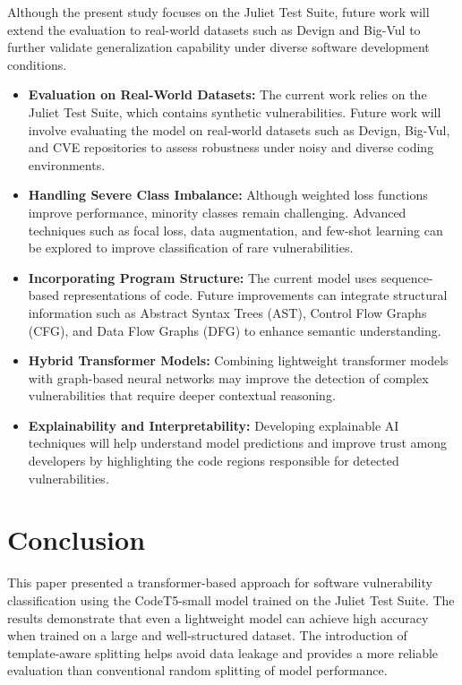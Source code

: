\documentclass[conference]{IEEEtran}
\begin{document}
Although the present study focuses on the Juliet Test Suite, future work will extend the evaluation to real-world datasets such as Devign and Big-Vul to further validate generalization capability under diverse software development conditions.

\begin{itemize}

\item \textbf{Evaluation on Real-World Datasets:}  
The current work relies on the Juliet Test Suite, which contains synthetic vulnerabilities. Future work will involve evaluating the model on real-world datasets such as Devign, Big-Vul, and CVE repositories to assess robustness under noisy and diverse coding environments.

\item \textbf{Handling Severe Class Imbalance:}  
Although weighted loss functions improve performance, minority classes remain challenging. Advanced techniques such as focal loss, data augmentation, and few-shot learning can be explored to improve classification of rare vulnerabilities.

\item \textbf{Incorporating Program Structure:}  
The current model uses sequence-based representations of code. Future improvements can integrate structural information such as Abstract Syntax Trees (AST), Control Flow Graphs (CFG), and Data Flow Graphs (DFG) to enhance semantic understanding.

\item \textbf{Hybrid Transformer Models:}  
Combining lightweight transformer models with graph-based neural networks may improve the detection of complex vulnerabilities that require deeper contextual reasoning.

\item \textbf{Explainability and Interpretability:}  
Developing explainable AI techniques will help understand model predictions and improve trust among developers by highlighting the code regions responsible for detected vulnerabilities.

\end{itemize}
\section{Conclusion}

This paper presented a transformer-based approach for software vulnerability classification using the CodeT5-small model trained on the Juliet Test Suite. The results demonstrate that even a lightweight model can achieve high accuracy when trained on a large and well-structured dataset. The introduction of template-aware splitting helps avoid data leakage and provides a more reliable evaluation than conventional random splitting of model performance.
\end{document}
